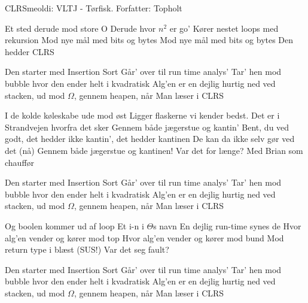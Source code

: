 \begin{sang}{CLRS}{meoldi: VLTJ - Tørfisk. Forfatter: Topholt}
    \begin{vers}
    Et sted derude mod store O
    Derude hvor $n^2$ er go'
    Kører nestet loops med rekursion
    Mod nye mål med bits og bytes
    Mod nye mål med bits og bytes
    Den hedder CLRS
    \end{vers}
    
    \begin{omkvaed}
    Den starter med Insertion Sort
    Går' over til run time analys' 
    Tar' hen mod bubble hvor den ender helt i kvadratisk
    Alg'en er en dejlig hurtig ned ved stacken, ud mod $\Omega$, gennem heapen, når
    Man læser i CLRS
    \end{omkvaed}
    
    \begin{vers}
    I de kolde køleskabe ude mod øst
    Ligger flaskerne vi kender bedst.
    Det er i Strandvejen hvorfra det sker
    Gennem både jægerstue og kantin'
    Bent, du ved godt, det hedder ikke kantin', det hedder kantinen
    De kan da ikke selv gør ved det (nå)
    Gennem både jægerstue og kantinen!
    Var det for længe?
    Med Brian som chauffør
    \end{vers}
    
    \begin{omkvaed}
    Den starter med Insertion Sort
    Går' over til run time analys' 
    Tar' hen mod bubble hvor den ender helt i kvadratisk
    Alg'en er en dejlig hurtig ned ved stacken, ud mod $\Omega$, gennem heapen, når
    Man læser i CLRS
    \end{omkvaed}
    
    \begin{vers}
    Og boolen kommer ud af loop
    Et i-n i $\Theta$s navn
    En dejlig run-time synes de
    Hvor alg'en vender og kører mod top
    Hvor alg'en vender og kører mod bund
    Mod return type i blæst (SUS!)
    Var det seg fault?
    \end{vers}
    
    \begin{omkvaed}
    Den starter med Insertion Sort
    Går' over til run time analys' 
    Tar' hen mod bubble hvor den ender helt i kvadratisk
    Alg'en er en dejlig hurtig ned ved stacken, ud mod $\Omega$, gennem heapen, når
    Man læser i CLRS
    \end{omkvaed}
    \end{sang}